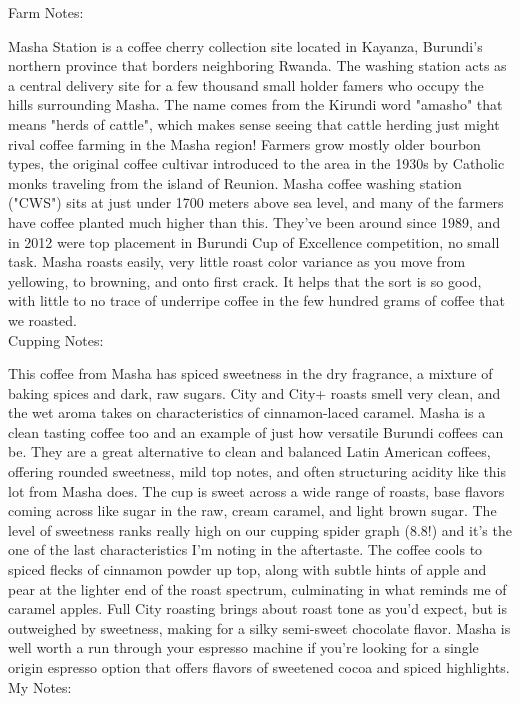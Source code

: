 \documentclass[10pt,twoside,footinclude=true,headinclude=true]{scrbook} %
\newlength{\mysize}
\newcommand{\myfontsize}[1]{
  \setlength{\mysize}{#1pt}
  \fontsize{\mysize}{1.2\mysize}
  \selectfont
}
\begin{document}

\newpage
\vspace*{-2.2em}
\raggedright
\normalsize
Farm Notes: \\
\myfontsize{8}
Masha Station is a coffee cherry collection site located in Kayanza, Burundi's northern province that borders neighboring Rwanda. The washing station acts as a central delivery site for a few thousand small holder famers who occupy the hills surrounding Masha. The name comes from the Kirundi word "amasho" that means "herds of cattle", which makes sense seeing that cattle herding just might rival coffee farming in the Masha region! Farmers grow mostly older bourbon types, the original coffee cultivar introduced to the area in the 1930s by Catholic monks traveling from the island of Reunion. Masha coffee washing station ("CWS") sits at just under 1700 meters above sea level, and many of the farmers have coffee planted much higher than this. They've been around since 1989, and in 2012 were top placement in Burundi Cup of Excellence competition, no small task. Masha roasts easily, very little roast color variance as you move from yellowing, to browning, and onto first crack. It helps that the sort is so good, with little to no trace of underripe coffee in the few hundred grams of coffee that we roasted. \\
\medskip
\normalsize
Cupping Notes: \\
\myfontsize{8}
This coffee from Masha has spiced sweetness in the dry fragrance, a mixture of baking spices and dark, raw sugars. City and City+ roasts smell very clean, and the wet aroma takes on characteristics of cinnamon-laced caramel. Masha is a clean tasting coffee too and an example of just how versatile Burundi coffees can be. They are a great alternative to clean and balanced Latin American coffees, offering rounded sweetness, mild top notes, and often structuring acidity like this lot from Masha does. The cup is sweet across a wide range of roasts, base flavors coming across like sugar in the raw, cream caramel, and light brown sugar. The level of sweetness ranks really high on our cupping spider graph (8.8!) and it's the one of the last characteristics I'm noting in the aftertaste. The coffee cools to spiced flecks of cinnamon powder up top, along with subtle hints of apple and pear at the lighter end of the roast spectrum, culminating in what reminds me of caramel apples. Full City roasting brings about roast tone as you'd expect, but is outweighed by sweetness, making for a silky semi-sweet chocolate flavor. Masha is well worth a run through your espresso machine if you're looking for a single origin espresso option that offers flavors of sweetened cocoa and spiced highlights. \\
\medskip
\normalsize
My Notes:
\end{document}
